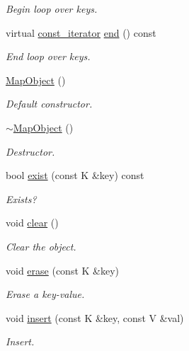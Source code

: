 \begin{DoxyCompactItemize}
\begin{DoxyCompactList}\small\item\em Begin loop over keys. \end{DoxyCompactList}\item 
virtual \mbox{\hyperlink{classADAT_1_1MapObject_a4622cd7d3b6fed18fe226d28091cc6c8}{const\+\_\+iterator}} \mbox{\hyperlink{classADAT_1_1MapObject_a1162459ba16798247ab64ee38be25bca}{end}} () const
\begin{DoxyCompactList}\small\item\em End loop over keys. \end{DoxyCompactList}\item 
\mbox{\hyperlink{classADAT_1_1MapObject_a27943eb119ceceef215cf8d638da096e}{Map\+Object}} ()
\begin{DoxyCompactList}\small\item\em Default constructor. \end{DoxyCompactList}\item 
\mbox{\hyperlink{classADAT_1_1MapObject_a11fc724ec76293a4ae1ae98aa5032dfd}{$\sim$\+Map\+Object}} ()
\begin{DoxyCompactList}\small\item\em Destructor. \end{DoxyCompactList}\item 
bool \mbox{\hyperlink{classADAT_1_1MapObject_a1d22f979e34bda97c3dc89d5fc937d3b}{exist}} (const K \&key) const
\begin{DoxyCompactList}\small\item\em Exists? \end{DoxyCompactList}\item 
void \mbox{\hyperlink{classADAT_1_1MapObject_ad4a8a70a7c12d4bdc488d6eac20388a1}{clear}} ()
\begin{DoxyCompactList}\small\item\em Clear the object. \end{DoxyCompactList}\item 
void \mbox{\hyperlink{classADAT_1_1MapObject_aa93bbf650a37c70e91904c9e7566eb6f}{erase}} (const K \&key)
\begin{DoxyCompactList}\small\item\em Erase a key-\/value. \end{DoxyCompactList}\item 
void \mbox{\hyperlink{classADAT_1_1MapObject_a5389738841dca1228aefe6935c464a78}{insert}} (const K \&key, const V \&val)
\begin{DoxyCompactList}\small\item\em Insert. \end{DoxyCompactList}\item 

\end{DoxyCompactItemize}
